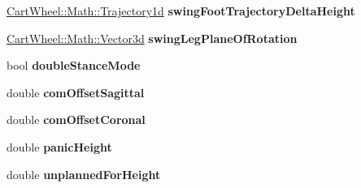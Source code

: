 \begin{DoxyCompactItemize}
\item 
\hypertarget{classCartWheel_1_1Core_1_1IKVMCController_af708c5c6a0b88120766be427de7fc979}{
\hyperlink{classCartWheel_1_1Math_1_1GenericTrajectory}{CartWheel::Math::Trajectory1d} {\bfseries swingFootTrajectoryDeltaHeight}}
\label{classCartWheel_1_1Core_1_1IKVMCController_af708c5c6a0b88120766be427de7fc979}

\item 
\hypertarget{classCartWheel_1_1Core_1_1IKVMCController_aeaf1ba27c43ed4b04166d9056a002b7e}{
\hyperlink{classCartWheel_1_1Math_1_1Vector3d}{CartWheel::Math::Vector3d} {\bfseries swingLegPlaneOfRotation}}
\label{classCartWheel_1_1Core_1_1IKVMCController_aeaf1ba27c43ed4b04166d9056a002b7e}

\item 
\hypertarget{classCartWheel_1_1Core_1_1IKVMCController_a5d80d92a40d8880b8ec2a7b46e14b8cc}{
bool {\bfseries doubleStanceMode}}
\label{classCartWheel_1_1Core_1_1IKVMCController_a5d80d92a40d8880b8ec2a7b46e14b8cc}

\item 
\hypertarget{classCartWheel_1_1Core_1_1IKVMCController_a0c8da4f9ec1602510364d69c5088b809}{
double {\bfseries comOffsetSagittal}}
\label{classCartWheel_1_1Core_1_1IKVMCController_a0c8da4f9ec1602510364d69c5088b809}

\item 
\hypertarget{classCartWheel_1_1Core_1_1IKVMCController_affd6d2a7b9090f2c32fc708dd006719c}{
double {\bfseries comOffsetCoronal}}
\label{classCartWheel_1_1Core_1_1IKVMCController_affd6d2a7b9090f2c32fc708dd006719c}

\item 
\hypertarget{classCartWheel_1_1Core_1_1IKVMCController_a37b3be467389aed61c11b083d0c1cce1}{
double {\bfseries panicHeight}}
\label{classCartWheel_1_1Core_1_1IKVMCController_a37b3be467389aed61c11b083d0c1cce1}

\item 
\hypertarget{classCartWheel_1_1Core_1_1IKVMCController_abb1fbfa679f1cb3663fa47178f1448b3}{
double {\bfseries unplannedForHeight}}
\label{classCartWheel_1_1Core_1_1IKVMCController_abb1fbfa679f1cb3663fa47178f1448b3}

\end{DoxyCompactItemize}
